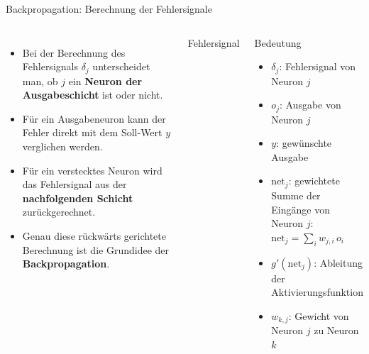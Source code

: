 \begin{frame}{Backpropagation: Berechnung der Fehlersignale}
\footnotesize
\begin{columns}


\begin{itemize}
    \item Bei der Berechnung des Fehlersignals $\delta_j$ unterscheidet man,
          ob $j$ ein \textbf{Neuron der Ausgabeschicht} ist oder nicht.

    \item Für ein Ausgabeneuron kann der Fehler direkt mit dem Soll-Wert $y$
          verglichen werden.

    \item Für ein verstecktes Neuron wird das Fehlersignal aus der
          \textbf{nachfolgenden Schicht} zurückgerechnet.

    \item Genau diese rückwärts gerichtete Berechnung ist die Grundidee der
          \textbf{Backpropagation}.
\end{itemize}


\begin{block}{\footnotesize Fehlersignal}

\noindent{}

\end{block}

\begin{blockC2}{\footnotesize Bedeutung}
\begin{itemize}
    \item $\delta_j$: Fehlersignal von Neuron $j$
    \item $o_j$: Ausgabe von Neuron $j$
    \item $y$: gewünschte Ausgabe
    \item $\mathrm{net}_j$: gewichtete Summe der Eingänge von Neuron $j$: $\mathrm{net}_j = \sum_i w_{j,i}\,o_i$
    \item $g'(\mathrm{net}_j)$: Ableitung der Aktivierungsfunktion
    \item $w_{k,j}$: Gewicht von Neuron $j$ zu Neuron $k$
\end{itemize}
\end{blockC2}
\end{columns}
\end{frame}


